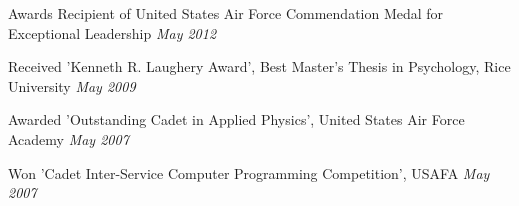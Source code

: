 
\begin{rSection}{Awards}
  Recipient of United States Air Force Commendation Medal for Exceptional Leadership \hfill {\em May 2012}
  \item Received 'Kenneth R. Laughery Award', Best Master’s Thesis in Psychology, Rice University \hfill {\em May 2009}
  \item Awarded 'Outstanding Cadet in Applied Physics', United States Air Force Academy \hfill {\em May 2007}
  \item Won 'Cadet Inter-Service Computer Programming Competition', USAFA \hfill {\em May 2007}
\end{rSection}
